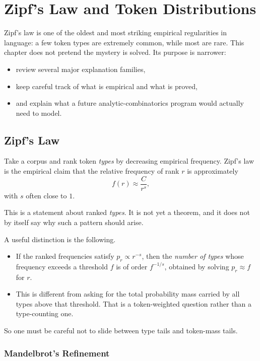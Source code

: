 \chapter{Zipf's Law and Token Distributions}
\label{ch16}

Zipf's law is one of the oldest and most striking empirical regularities in language: a few token types are extremely common, while most are rare. This chapter does not pretend the mystery is solved. Its purpose is narrower:
\begin{itemize}
  \item review several major explanation families,
  \item keep careful track of what is empirical and what is proved,
  \item and explain what a future analytic-combinatorics program would actually need to model.
\end{itemize}

\section{Zipf's Law}

\begin{definition}
Take a corpus and rank token \emph{types} by decreasing empirical frequency. Zipf's law is the empirical claim that the relative frequency of rank $r$ is approximately
\[
  f(r) \approx \frac{C}{r^s},
\]
with $s$ often close to $1$.
\end{definition}

This is a statement about ranked \emph{types}. It is not yet a theorem, and it does not by itself say why such a pattern should arise.

A useful distinction is the following.
\begin{itemize}
  \item If the ranked frequencies satisfy $p_r \propto r^{-s}$, then the \emph{number of types} whose frequency exceeds a threshold $f$ is of order $f^{-1/s}$, obtained by solving $p_r \approx f$ for $r$.
  \item This is different from asking for the total probability mass carried by all types above that threshold. That is a token-weighted question rather than a type-counting one.
\end{itemize}
So one must be careful not to slide between type tails and token-mass tails.

\subsection{Mandelbrot's Refinement}


